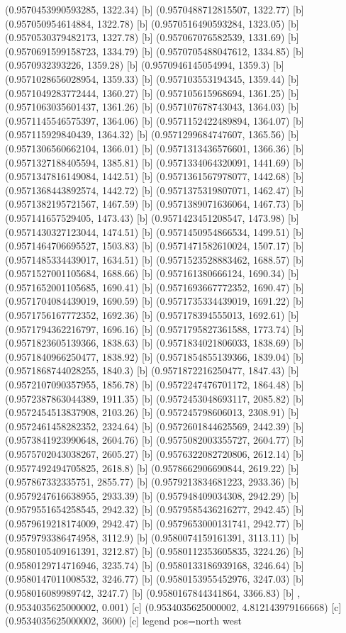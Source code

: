 {{{(0.9570453990593285, 1322.34) [b] 
(0.9570488712815507, 1322.77) [b] 
(0.957050954614884, 1322.78) [b] 
(0.9570516490593284, 1323.05) [b] 
(0.9570530379482173, 1327.78) [b] 
(0.957067076582539, 1331.69) [b] 
(0.9570691599158723, 1334.79) [b] 
(0.9570705488047612, 1334.85) [b] 
(0.9570932393226, 1359.28) [b] 
(0.9570946145054994, 1359.3) [b] 
(0.9571028656028954, 1359.33) [b] 
(0.957103553194345, 1359.44) [b] 
(0.9571049283772444, 1360.27) [b] 
(0.957105615968694, 1361.25) [b] 
(0.9571063035601437, 1361.26) [b] 
(0.957107678743043, 1364.03) [b] 
(0.9571145546575397, 1364.06) [b] 
(0.9571152422489894, 1364.07) [b] 
(0.957115929840439, 1364.32) [b] 
(0.9571299684747607, 1365.56) [b] 
(0.9571306560662104, 1366.01) [b] 
(0.9571313436576601, 1366.36) [b] 
(0.9571327188405594, 1385.81) [b] 
(0.9571334064320091, 1441.69) [b] 
(0.9571347816149084, 1442.51) [b] 
(0.9571361567978077, 1442.68) [b] 
(0.9571368443892574, 1442.72) [b] 
(0.9571375319807071, 1462.47) [b] 
(0.9571382195721567, 1467.59) [b] 
(0.9571389071636064, 1467.73) [b] 
(0.957141657529405, 1473.43) [b] 
(0.9571423451208547, 1473.98) [b] 
(0.9571430327123044, 1474.51) [b] 
(0.9571450954866534, 1499.51) [b] 
(0.9571464706695527, 1503.83) [b] 
(0.9571471582610024, 1507.17) [b] 
(0.9571485334439017, 1634.51) [b] 
(0.9571523528883462, 1688.57) [b] 
(0.9571527001105684, 1688.66) [b] 
(0.957161380666124, 1690.34) [b] 
(0.9571652001105685, 1690.41) [b] 
(0.9571693667772352, 1690.47) [b] 
(0.9571704084439019, 1690.59) [b] 
(0.9571735334439019, 1691.22) [b] 
(0.9571756167772352, 1692.36) [b] 
(0.957178394555013, 1692.61) [b] 
(0.9571794362216797, 1696.16) [b] 
(0.9571795827361588, 1773.74) [b] 
(0.9571823605139366, 1838.63) [b] 
(0.9571834021806033, 1838.69) [b] 
(0.9571840966250477, 1838.92) [b] 
(0.9571854855139366, 1839.04) [b] 
(0.9571868744028255, 1840.3) [b] 
(0.9571872216250477, 1847.43) [b] 
(0.9572107090357955, 1856.78) [b] 
(0.9572247476701172, 1864.48) [b] 
(0.9572387863044389, 1911.35) [b] 
(0.9572453048693117, 2085.82) [b] 
(0.9572454513837908, 2103.26) [b] 
(0.957245798606013, 2308.91) [b] 
(0.9572461458282352, 2324.64) [b] 
(0.9572601844625569, 2442.39) [b] 
(0.9573841923990648, 2604.76) [b] 
(0.9575082003355727, 2604.77) [b] 
(0.9575702043038267, 2605.27) [b] 
(0.9576322082720806, 2612.14) [b] 
(0.9577492494705825, 2618.8) [b] 
(0.9578662906690844, 2619.22) [b] 
(0.957867332335751, 2855.77) [b] 
(0.9579213834681223, 2933.36) [b] 
(0.9579247616638955, 2933.39) [b] 
(0.957948409034308, 2942.29) [b] 
(0.9579551654258545, 2942.32) [b] 
(0.9579585436216277, 2942.45) [b] 
(0.9579619218174009, 2942.47) [b] 
(0.9579653000131741, 2942.77) [b] 
(0.9579793386474958, 3112.9) [b] 
(0.9580074159161391, 3113.11) [b] 
(0.9580105409161391, 3212.87) [b] 
(0.9580112353605835, 3224.26) [b] 
(0.9580129714716946, 3235.74) [b] 
(0.9580133186939168, 3246.64) [b] 
(0.9580147011008532, 3246.77) [b] 
(0.9580153955452976, 3247.03) [b] 
(0.958016089989742, 3247.7) [b] 
(0.9580167844341864, 3366.83) [b] 
},{(0.9534035625000002, 0.001) [c] 
(0.9534035625000002, 4.812143979166668) [c] 
(0.9534035625000002, 3600) [c] 
}}}{legend pos=north west}